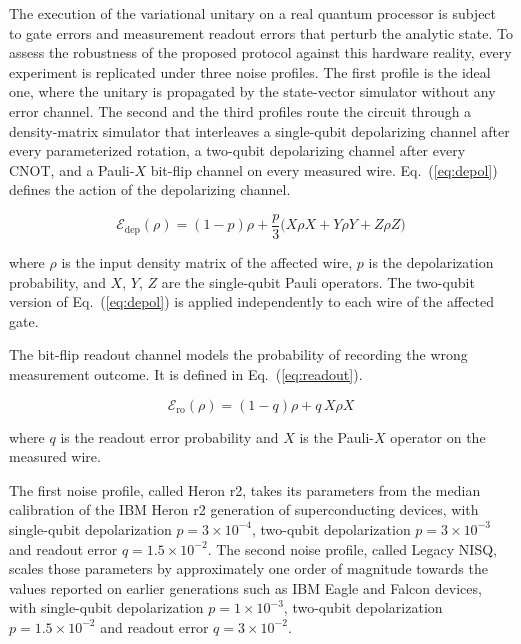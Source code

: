 \documentclass[conference]{IEEEtran}
\begin{document}
The execution of the variational unitary on a real quantum processor is subject to gate errors and measurement readout errors that perturb the analytic state. To assess the robustness of the proposed protocol against this hardware reality, every experiment is replicated under three noise profiles. The first profile is the ideal one, where the unitary is propagated by the state-vector simulator without any error channel. The second and the third profiles route the circuit through a density-matrix simulator that interleaves a single-qubit depolarizing channel after every parameterized rotation, a two-qubit depolarizing channel after every CNOT, and a Pauli-$X$ bit-flip channel on every measured wire. Eq.~(\ref{eq:depol}) defines the action of the depolarizing channel.

\begin{equation}
\mathcal{E}_{\text{dep}}(\rho) = (1-p)\rho + \frac{p}{3}\bigl(X\rho X + Y\rho Y + Z\rho Z\bigr)
\label{eq:depol}
\end{equation}

where $\rho$ is the input density matrix of the affected wire, $p$ is the depolarization probability, and $X$, $Y$, $Z$ are the single-qubit Pauli operators. The two-qubit version of Eq.~(\ref{eq:depol}) is applied independently to each wire of the affected gate.

The bit-flip readout channel models the probability of recording the wrong measurement outcome. It is defined in Eq.~(\ref{eq:readout}).

\begin{equation}
\mathcal{E}_{\text{ro}}(\rho) = (1-q)\rho + q\,X\rho X
\label{eq:readout}
\end{equation}

where $q$ is the readout error probability and $X$ is the Pauli-$X$ operator on the measured wire.

The first noise profile, called Heron r2, takes its parameters from the median calibration of the IBM Heron r2 generation of superconducting devices, with single-qubit depolarization $p=3\times 10^{-4}$, two-qubit depolarization $p=3\times 10^{-3}$ and readout error $q=1.5\times 10^{-2}$. The second noise profile, called Legacy NISQ, scales those parameters by approximately one order of magnitude towards the values reported on earlier generations such as IBM Eagle and Falcon devices, with single-qubit depolarization $p=1\times 10^{-3}$, two-qubit depolarization $p=1.5\times 10^{-2}$ and readout error $q=3\times 10^{-2}$.
\end{document}
